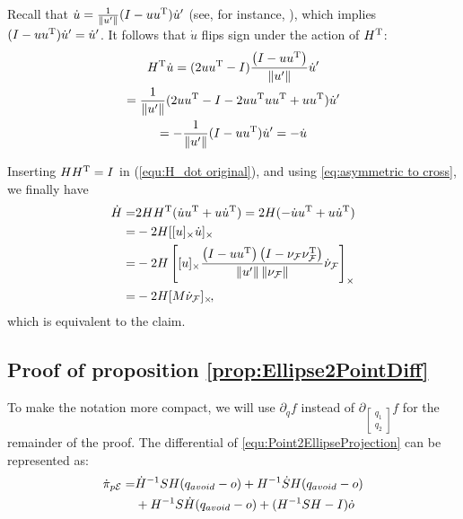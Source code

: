 \documentclass[journal]{IEEEtran}  %
\begin{document}
    Recall that $\dot{u}=\frac{1}{\lVert u'\rVert}(I-uu^\mathrm{T})\dot{u}'$ (see, for instance, \cite{Tron:Arxiv14}), which implies $(I-uu^\mathrm{T})\dot{u}'=\dot{u}'$. It follows that $\dot{u}$ flips sign under the action of $H^\mathrm{T}$:
    \begin{multline}
      H^\mathrm{T} \dot u = (2u u^\mathrm{T}-I)\frac{ \left( I - u u^\mathrm{T} \right) } {\left\|u'\right\|} \dot u' \\
      =\frac{1}{\lVert u'\rVert} (2u u^\mathrm{T}-I-2u u^\mathrm{T} u u^\mathrm{T}+u u^\mathrm{T})\dot{u}'\\
      = -\frac{1}{\lVert u'\rVert} (I-u u^\mathrm{T})\dot u'
      = -\dot u
    \end{multline}

    Inserting $HH^\mathrm{T}=I$ in (\ref{equ:H_dot original}), and using \ref{eq:asymmetric to cross}, we finally have
    \begin{equation}
      \begin{split}
        \dot H =  &  2H H^\mathrm{T}(\dot u u^\mathrm{T} + u \dot u^\mathrm{T})
        =  2 H (-\dot u u^\mathrm{T} + u \dot u^\mathrm{T})\\
        =  &  -2H [[u]_{\times} \dot u]_{\times} \\
        = &  -2 H \left[ [u]_{\times}  \frac{ \left( I - u u^\mathrm{T} \right) \left( I- \nu_{\mathcal{F}} \nu_{\mathcal{F}}^\mathrm{T} \right)} {\left\|u'\right\| \left\|\nu_{\mathcal{F}}\right\|} \dot{\nu}_{\mathcal{F}}\right]_{\times}\\
        = & -2 H [M \dot{\nu}_{\mathcal{F}}]_{\times}\!,
      \end{split}
    \end{equation}
    which is equivalent to the claim.
  
  \subsection{Proof of proposition \ref{prop:Ellipse2PointDiff}}\label{proof:Ellipse2PointDiff}
      To make the notation more compact, we will use $\partial_q f$ instead of $\partial_{\left[\begin{smallmatrix}q_1\\q_2\end{smallmatrix}\right]} f$ for the remainder of the proof.
    The differential of \eqref{equ:Point2EllipseProjection} can be represented as:
    \begin{equation}\label{equ:dPi_dt}
      \begin{split}
        \dot \pi_{p\mathcal{E}} = &  \dot H^{-1}SH (q_{avoid} - o)  + H^{-1}\dot S H (q_{avoid} - o) \\
        &+ H^{-1}S \dot H (q_{avoid} - o) + (H^{-1}SH -I)\dot o\\
      \end{split}
    \end{equation}
\end{document}
